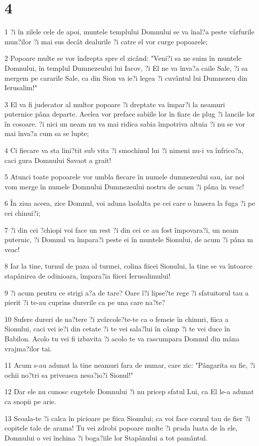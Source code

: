 \chapter{4}

\par 1 ?i în zilele cele de apoi, muntele templului Domnului se va înal?a peste vârfurile mun?ilor ?i mai sus decât dealurile ?i catre el vor curge popoarele;
\par 2 Popoare multe se vor îndrepta spre el zicând: "Veni?i sa ne suim în muntele Domnului, în templul Dumnezeului lui Iacov, ?i El ne va înva?a caile Sale, ?i sa mergem pe cararile Sale, ca din Sion va ie?i legea ?i cuvântul lui Dumnezeu din Ierusalim!"
\par 3 El va fi judecator al multor popoare ?i dreptate va împar?i la neamuri puternice pâna departe. Acelea vor preface sabiile lor în fiare de plug ?i lancile lor în cosoare. ?i nici un neam nu va mai ridica sabia împotriva altuia ?i nu se vor mai înva?a cum sa se lupte;
\par 4 Ci fiecare va sta lini?tit sub vita ?i smochinul lui ?i nimeni nu-i va înfrico?a, caci gura Domnului Savaot a grait!
\par 5 Atunci toate popoarele vor umbla fiecare în numele dumnezeului sau, iar noi vom merge în numele Domnului Dumnezeului nostru de acum ?i pâna în veac!
\par 6 În ziua aceea, zice Domnul, voi aduna laolalta pe cei care o luasera la fuga ?i pe cei chinui?i;
\par 7 ?i din cei ?chiopi voi face un rest ?i din cei ce au fost împovara?i, un neam puternic, ?i Domnul va împara?i peste ei în muntele Sionului, de acum ?i pâna m veac!
\par 8 Iar la tine, turnul de paza al turmei, colina fiicei Sionului, la tine se va întoarce stapânirea de odinioara, împara?ia fiicei Ierusalimului!
\par 9 ?i acum pentru ce strigi a?a de tare? Oare î?i lipse?te rege ?i sfatuitorul tau a pierit ?i te-au cuprins durerile ca pe una care na?te?
\par 10 Sufere dureri de na?tere ?i zvârcole?te-te ca o femeie în chinuri, fiica a Sionului, caci vei ie?i din cetate ?i te vei sala?lui în câmp ?i te vei duce în Babilon. Acolo tu vei fi izbavita ?i acolo te va rascumpara Domnul din mâna vrajma?ilor tai.
\par 11 Acum s-au adunat la tine neamuri fara de numar, care zic: "Pângarita sa fie, ?i ochii no?tri sa priveasca nesa?io?i Sionul!"
\par 12 Dar ele nu cunosc cugetele Domnului ?i nu pricep sfatul Lui, ca El le-a adunat ca snopii pe arie.
\par 13 Scoala-te ?i calca în picioare pe fiica Sionului; ca voi face cornul tau de fier ?i copitele tale de arama! Tu vei zdrobi popoare multe ?i prada luata de la ele, Domnului o vei închina ?i boga?iile lor Stapânului a tot pamântul.

